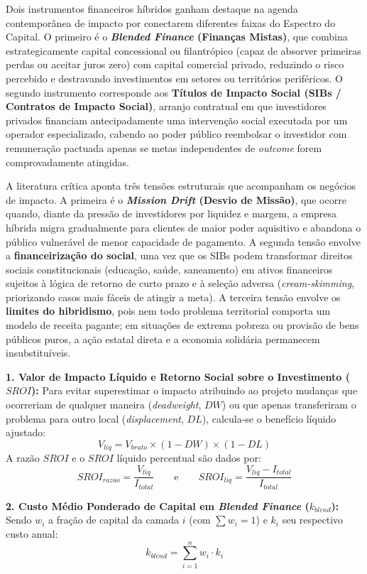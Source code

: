 Dois instrumentos financeiros híbridos ganham destaque na agenda contemporânea de impacto por conectarem diferentes faixas do Espectro do Capital. O primeiro é o \textbf{\textit{Blended Finance} (Finanças Mistas)}, que combina estrategicamente capital concessional ou filantrópico (capaz de absorver primeiras perdas ou aceitar juros zero) com capital comercial privado, reduzindo o risco percebido e destravando investimentos em setores ou territórios periféricos. O segundo instrumento corresponde aos \textbf{Títulos de Impacto Social (SIBs / Contratos de Impacto Social)}, arranjo contratual em que investidores privados financiam antecipadamente uma intervenção social executada por um operador especializado, cabendo ao poder público reembolsar o investidor com remuneração pactuada apenas se metas independentes de \textit{outcome} forem comprovadamente atingidas.

\begin{boxConceito}
A literatura crítica aponta três tensões estruturais que acompanham os negócios de impacto. A primeira é o \textbf{\textit{Mission Drift} (Desvio de Missão)}, que ocorre quando, diante da pressão de investidores por liquidez e margem, a empresa híbrida migra gradualmente para clientes de maior poder aquisitivo e abandona o público vulnerável de menor capacidade de pagamento. A segunda tensão envolve a \textbf{financeirização do social}, uma vez que os SIBs podem transformar direitos sociais constitucionais (educação, saúde, saneamento) em ativos financeiros sujeitos à lógica de retorno de curto prazo e à seleção adversa (\textit{cream-skimming}, priorizando casos mais fáceis de atingir a meta). A terceira tensão envolve os \textbf{limites do hibridismo}, pois nem todo problema territorial comporta um modelo de receita pagante; em situações de extrema pobreza ou provisão de bens públicos puros, a ação estatal direta e a economia solidária permanecem insubstituíveis.
\end{boxConceito}

\begin{boxFormula}
\textbf{1. Valor de Impacto Líquido e Retorno Social sobre o Investimento ($SROI$):}
Para evitar superestimar o impacto atribuindo ao projeto mudanças que ocorreriam de qualquer maneira (\textit{deadweight}, $DW$) ou que apenas transferiram o problema para outro local (\textit{displacement}, $DL$), calcula-se o benefício líquido ajustado:
\[
V_{liq} = V_{bruto} \times (1 - DW) \times (1 - DL)
\]
A razão $SROI$ e o $SROI$ líquido percentual são dados por:
\[
SROI_{razao} = \frac{V_{liq}}{I_{total}} \qquad \text{e} \qquad SROI_{liq} = \frac{V_{liq} - I_{total}}{I_{total}}
\]

\textbf{2. Custo Médio Ponderado de Capital em \textit{Blended Finance} ($k_{blend}$):}
Sendo $w_i$ a fração de capital da camada $i$ (com $\sum w_i = 1$) e $k_i$ seu respectivo custo anual:
\[
k_{blend} = \sum_{i=1}^{n} w_i \cdot k_i
\]
\end{boxFormula}

